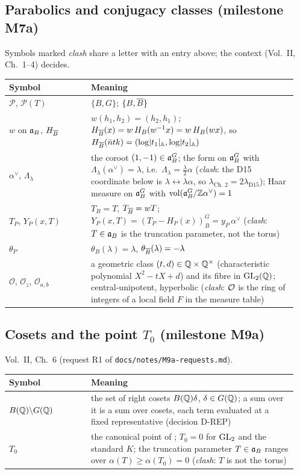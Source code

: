 \subsection*{Parabolics and conjugacy classes (milestone M7a)}
Symbols marked \emph{clash} share a letter with an entry above; the context (Vol.~II, Ch.~1--4) decides.
\begin{longtable}{@{}p{0.27\linewidth}p{0.68\linewidth}@{}}
\toprule
Symbol & Meaning \\ \midrule
\endhead
$\mathcal P$, $\mathcal P(T)$ & $\{B,G\}$; $\{B,\overline{B}\}$ \\
$w$ on $\mathfrak{a}_B$, $H_{\overline{B}}$ & $w(h_1,h_2)=(h_2,h_1)$; $H_{\overline{B}}(x)=w\,H_B(w^{-1}x)=w\,H_B(wx)$, so $H_{\overline{B}}(\bar ntk)=(\log\lvert t_1\rvert_{\mathbb{A}},\log\lvert t_2\rvert_{\mathbb{A}})$ \\
$\alpha^\vee$, $\Lambda_\lambda$ & the coroot $(1,-1)\in\mathfrak{a}_B^G$; the form on $\mathfrak{a}_B^G$ with $\Lambda_\lambda(\alpha^\vee)=\lambda$, i.e.\ $\Lambda_\lambda=\frac\lambda2\alpha$ (\emph{clash}: the D15 coordinate below
  is $\lambda\leftrightarrow\lambda\alpha$, so $\lambda_{\text{Ch.~2}}=2\lambda_{\text{D15}}$); Haar measure on $\mathfrak{a}_B^G$ with $\operatorname{vol}(\mathfrak{a}_B^G/\mathbb{Z}\alpha^\vee)=1$ \\
$T_P$, $Y_P(x,T)$ & $T_B=T$, $T_{\overline{B}}=wT$; $Y_P(x,T)=(T_P-H_P(x))_B^G=y_P\,\alpha^\vee$ (\emph{clash}: $T\in\mathfrak{a}_B$ is the truncation parameter, not the torus) \\
$\theta_P$ & $\theta_B(\lambda)=\lambda$, $\theta_{\overline{B}}(\lambda)=-\lambda$ \\
$\mathcal O$, $\mathcal O_z$, $\mathcal O_{a,b}$ & a geometric class $(t,d)\in\mathbb{Q}\times\mathbb{Q}^\times$ (characteristic polynomial $X^2-tX+d$) and its fibre in $\mathrm{GL}_2(\mathbb{Q})$; central-unipotent, hyperbolic
  (\emph{clash}: $\mathcal{O}$ is the ring of integers of a local field $F$ in the measure table) \\
\bottomrule
\end{longtable}

\subsection*{Cosets and the point $T_0$ (milestone M9a)}\label{notation:m9a}
Vol.~II, Ch.~6 (request R1 of \texttt{docs/notes/M9a-requests.md}).
\begin{longtable}{@{}p{0.27\linewidth}p{0.68\linewidth}@{}}
\toprule
Symbol & Meaning \\ \midrule
\endhead
$B(\mathbb{Q})\backslash G(\mathbb{Q})$ & the set of right cosets $B(\mathbb{Q})\delta$, $\delta\in G(\mathbb{Q})$; a sum over it is a sum over cosets, each term evaluated at a fixed representative
  (decision D-REP) \\
$T_0$ & the canonical point of \cite[(9.4)]{AIntro}; $T_0=0$ for $\mathrm{GL}_2$ and the standard $K$; the truncation parameter $T\in\mathfrak{a}_B$ ranges over $\alpha(T)\ge\alpha(T_0)=0$
  (\emph{clash}: $T$ is not the torus) \\
\bottomrule
\end{longtable}

